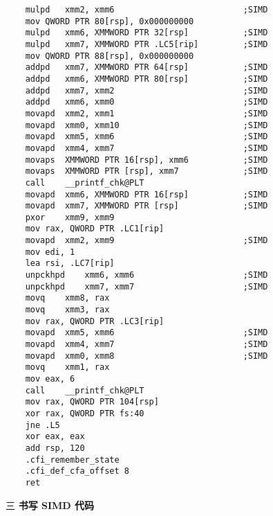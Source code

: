 \documentclass[12pt,a4paper]{article}
\newenvironment{problems}{\begin{list}{}{\renewcommand{\makelabel}[1]{\textbf{##1}.\hfil}}}{\end{list}}
\begin{document}
\begin{problems}
\begin{multicols}{2}
\begin{lstlisting}
	mulpd	xmm2, xmm6							;SIMD
	mov	QWORD PTR 80[rsp], 0x000000000
	mulpd	xmm6, XMMWORD PTR 32[rsp]			;SIMD
	mulpd	xmm7, XMMWORD PTR .LC5[rip]			;SIMD
	mov	QWORD PTR 88[rsp], 0x000000000
	addpd	xmm7, XMMWORD PTR 64[rsp]			;SIMD
	addpd	xmm6, XMMWORD PTR 80[rsp]			;SIMD
	addpd	xmm7, xmm2							;SIMD
	addpd	xmm6, xmm0							;SIMD
	movapd	xmm2, xmm1							;SIMD
	movapd	xmm0, xmm10							;SIMD
	movapd	xmm5, xmm6							;SIMD
	movapd	xmm4, xmm7							;SIMD
	movaps	XMMWORD PTR 16[rsp], xmm6			;SIMD
	movaps	XMMWORD PTR [rsp], xmm7				;SIMD
	call	__printf_chk@PLT
	movapd	xmm6, XMMWORD PTR 16[rsp]			;SIMD
	movapd	xmm7, XMMWORD PTR [rsp]				;SIMD
	pxor	xmm9, xmm9
	mov	rax, QWORD PTR .LC1[rip]	
	movapd	xmm2, xmm9							;SIMD
	mov	edi, 1	
	lea	rsi, .LC7[rip]
	unpckhpd	xmm6, xmm6						;SIMD
	unpckhpd	xmm7, xmm7						;SIMD
	movq	xmm8, rax
	movq	xmm3, rax
	mov	rax, QWORD PTR .LC3[rip]
	movapd	xmm5, xmm6							;SIMD
	movapd	xmm4, xmm7							;SIMD	
	movapd	xmm0, xmm8							;SIMD
	movq	xmm1, rax
	mov	eax, 6
	call	__printf_chk@PLT
	mov	rax, QWORD PTR 104[rsp]
	xor	rax, QWORD PTR fs:40
	jne	.L5
	xor	eax, eax
	add	rsp, 120
	.cfi_remember_state
	.cfi_def_cfa_offset 8
	ret
    \end{lstlisting} 
	\end{multicols}
    
	\item[三] \textbf{书写 SIMD 代码}
	
	
\end{problems}
\end{document}
